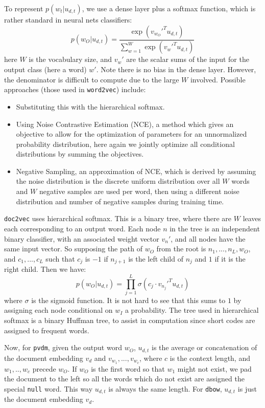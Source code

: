 \documentclass{article}
\begin{document}
To represent $p(w_t|u_{d,t})$, we use a dense layer plus a softmax function, which is rather standard in neural nets classifiers:
    \[p(w_O|u_{d,t})=\frac{\exp(v_{w_O}'^T u_{d,t})}{\sum_{w=1}^W \exp(v_w'^T u_{d,t})}\]
here $W$ is the vocabulary size, and $v_w'$ are the scalar sums of the input for the output class (here a word) $w'$. Note there is no bias in the dense layer. However, the denominator is difficult to compute due to the large $W$ involved. Possible approaches (those used in \texttt{word2vec}) include:
\begin{itemize}
    \item Substituting this with the hierarchical softmax.
    \item Using Noise Contrastive Estimation (NCE), a method which gives an objective to allow for the optimization of parameters for an unnormalized probability distribution, here again we jointly optimize all conditional distributions by summing the objectives.
    \item Negative Sampling, an approximation of NCE, which is derived by assuming the noise distribution is the discrete uniform distribution over all $W$ words and $W$ negative samples are used per word, then using a different noise distribution and number of negative samples during training time.
\end{itemize}

\texttt{doc2vec} uses hierarchical softmax. This is a binary tree, where there are $W$ leaves each corresponding to an output word. Each node $n$ in the tree is an independent binary classifier, with an associated weight vector $v_n'$, and all nodes have the same input vector. So supposing the path of $w_O$ from the root is $n_1,...,n_L,w_O$, and $c_1,...,c_L$ such that $c_j$ is $-1$ if $n_{j+1}$ is the left child of ${n_j}$ and $1$ if it is the right child. Then we have:
    \[p(w_O|u_{d,t})=\prod_{j=1}^{L}\sigma(c_j\cdot v_{n_j}'^T u_{d,t})\]
where $\sigma$ is the sigmoid function. It is not hard to see that this sums to $1$ by assigning each node conditional on $w_I$ a probability. The tree used in hierarchical softmax is a binary Huffman tree, to assist in computation since short codes are assigned to frequent words.

Now, for \texttt{pvdm}, given the output word $w_O$, $u_{d,t}$ is the average or concatenation of the document embedding $v_d$ and $v_{w_1},...,v_{w_c}$, where $c$ is the context length, and $w_1,..,w_c$ precede $w_O$. If $w_O$ is the first word so that $w_1$ might not exist, we pad the document to the left so all the words which do not exist are assigned the special \texttt{null} word. This way $u_{d,t}$ is always the same length. For \texttt{dbow}, $u_{d,t}$ is just the document embedding $v_d$.
\end{document}
